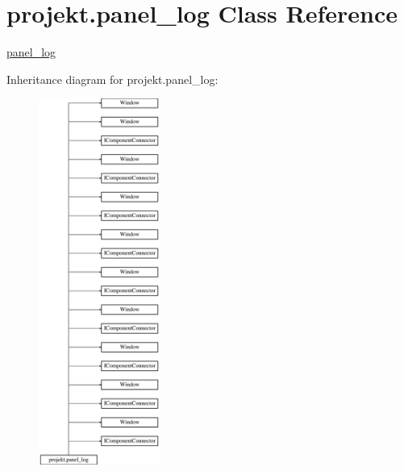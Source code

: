 \hypertarget{classprojekt_1_1panel__log}{}\section{projekt.\+panel\+\_\+log Class Reference}
\label{classprojekt_1_1panel__log}


\mbox{\hyperlink{classprojekt_1_1panel__log}{panel\+\_\+log}}  


Inheritance diagram for projekt.\+panel\+\_\+log\+:\begin{figure}[H]
\begin{center}
\leavevmode
\includegraphics[height=12.000000cm]{classprojekt_1_1panel__log}
\end{center}
\end{figure}
